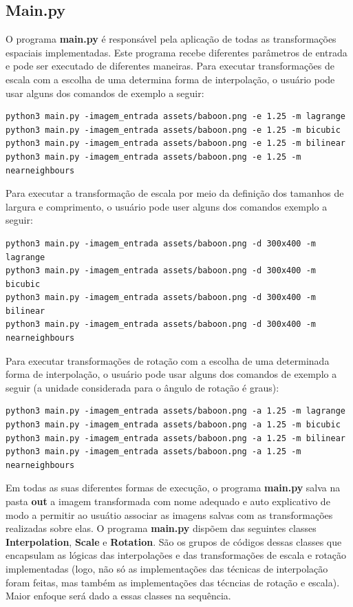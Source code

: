 \documentclass{article}
\begin{document}
\subsection{Main.py}
O programa \textbf{main.py} é responsável pela aplicação de todas as transformações espaciais implementadas. Este programa recebe diferentes parâmetros de entrada e pode ser executado de diferentes maneiras. Para executar transformações de escala com a escolha de uma determina forma de interpolação, o usuário pode usar alguns dos comandos de exemplo a seguir:
\begin{lstlisting}
python3 main.py -imagem_entrada assets/baboon.png -e 1.25 -m lagrange
python3 main.py -imagem_entrada assets/baboon.png -e 1.25 -m bicubic
python3 main.py -imagem_entrada assets/baboon.png -e 1.25 -m bilinear
python3 main.py -imagem_entrada assets/baboon.png -e 1.25 -m nearneighbours
\end{lstlisting}

\noindent
Para executar a transformação de escala por meio da definição dos tamanhos de largura e comprimento, o usuário pode user alguns dos comandos exemplo a seguir:
\begin{lstlisting}
python3 main.py -imagem_entrada assets/baboon.png -d 300x400 -m lagrange
python3 main.py -imagem_entrada assets/baboon.png -d 300x400 -m bicubic
python3 main.py -imagem_entrada assets/baboon.png -d 300x400 -m bilinear
python3 main.py -imagem_entrada assets/baboon.png -d 300x400 -m nearneighbours
\end{lstlisting}

\noindent
Para executar transformações de rotação com a escolha de uma determinada forma de interpolação, o usuário pode usar alguns dos comandos de exemplo a seguir (a unidade considerada para o ângulo de rotação é graus):
\begin{lstlisting}
python3 main.py -imagem_entrada assets/baboon.png -a 1.25 -m lagrange
python3 main.py -imagem_entrada assets/baboon.png -a 1.25 -m bicubic
python3 main.py -imagem_entrada assets/baboon.png -a 1.25 -m bilinear
python3 main.py -imagem_entrada assets/baboon.png -a 1.25 -m nearneighbours
\end{lstlisting}


Em todas as suas diferentes formas de execução, o programa \textbf{main.py} salva na pasta \textbf{out} a imagem transformada com nome adequado e auto explicativo de modo a permitir ao usuátio associar as imagens salvas com as transformações realizadas sobre elas. O programa \textbf{main.py} dispõem das seguintes classes \textbf{Interpolation}, \textbf{Scale} e \textbf{Rotation}. São os grupos de códigos dessas classes que encapsulam as lógicas das interpolações e das transformações de escala e rotação implementadas (logo, não só as implementações das técnicas de interpolação foram feitas, mas também as implementações das técncias de rotação e escala). Maior enfoque será dado a essas classes na sequência.
\end{document}
